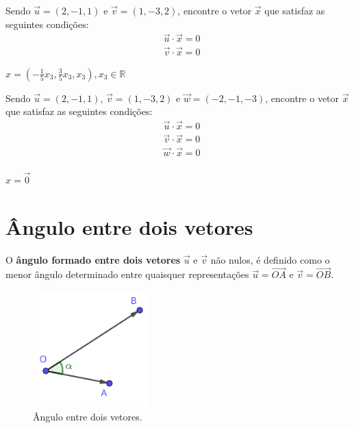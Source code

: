 \begin{exer}
  Sendo $\vec{u}=(2,-1,1)$ e $\vec{v}=(1,-3,2)$, encontre o vetor $\vec{x}$ que satisfaz as seguintes condições:
  \begin{align}
    &\vec{u}\cdot\vec{x} = 0\\
    &\vec{v}\cdot\vec{x} = 0
  \end{align}
\end{exer}
\begin{resp}
  $\displaystyle x = \left(-\frac{1}{5}x_3, \frac{3}{5}x_3, x_3\right), x_3\in\mathbb{R}$
\end{resp}

\begin{exer}
  Sendo $\vec{u}=(2,-1,1)$, $\vec{v}=(1,-3,2)$ e $\vec{w}=(-2,-1,-3)$, encontre o vetor $\vec{x}$ que satisfaz as seguintes condições:
  \begin{align}
    &\vec{u}\cdot\vec{x} = 0\\
    &\vec{v}\cdot\vec{x} = 0\\
    &\vec{w}\cdot\vec{x} = 0\\
  \end{align}
\end{exer}
\begin{resp}
  $x = \vec{0}$
\end{resp}

\section{Ângulo entre dois vetores}\label{cap_prodesc_sec_angulo}

O {\bf ângulo formado entre dois vetores} $\vec{u}$ e $\vec{v}$ não nulos, é definido como o menor ângulo determinado entre quaisquer representações $\vec{u} = \overrightarrow{OA}$ e $\vec{v} = \overrightarrow{OB}$.

\begin{figure}[H]
  \centering
  \includegraphics[width=0.4\textwidth]{./cap_prodesc/dados/fig_vetangulo/fig_vetangulo}
  \caption{Ângulo entre dois vetores.}
  \label{fig:prodesc_vetangulo}
\end{figure}

